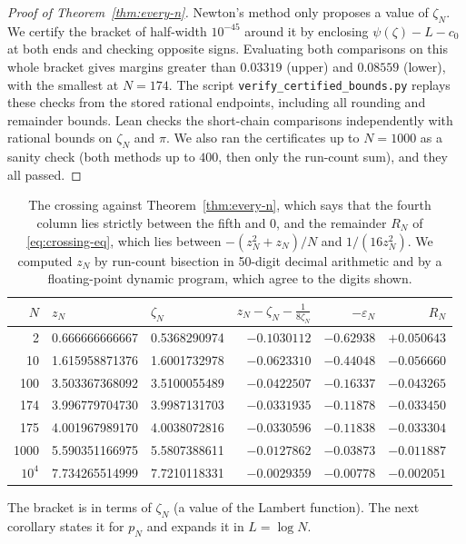 \begin{proof}[Proof of Theorem~\ref{thm:every-n}]
Newton's method only proposes a value of $\zeta_N$. We certify the bracket
of half-width $10^{-45}$ around it by enclosing
$\psi(\zeta)-L-c_0$ at both ends and checking opposite signs.
Evaluating both comparisons on this whole bracket gives margins greater than
$0.03319$ (upper) and $0.08559$ (lower), with the smallest at $N=174$.
The script \nolinkurl{verify_certified_bounds.py} replays these checks from
the stored rational endpoints, including all rounding and remainder bounds.
Lean checks the short-chain comparisons independently with rational bounds on $\zeta_N$ and $\pi$. We
also ran the certificates up to $N=1000$ as a sanity check (both methods up to
$400$, then only the run-count sum), and they all passed.
\end{proof}

\begin{table}[ht]
\centering\small
\begin{tabular}{@{}rllrrr@{}}
\toprule
$N$ & $z_N$ & $\zeta_N$ & $z_N-\zeta_N-\frac1{8\zeta_N}$ & $-\varepsilon_N$ & $R_N$\\
\midrule
2 & 0.666666666667 & 0.5368290974 & $-0.1030112$ & $-0.62938$ & $+0.050643$\\
10 & 1.615958871376 & 1.6001732978 & $-0.0623310$ & $-0.44048$ & $-0.056660$\\
100 & 3.503367368092 & 3.5100055489 & $-0.0422507$ & $-0.16337$ & $-0.043265$\\
174 & 3.996779704730 & 3.9987131703 & $-0.0331935$ & $-0.11878$ & $-0.033450$\\
175 & 4.001967989170 & 4.0038072816 & $-0.0330596$ & $-0.11838$ & $-0.033304$\\
1000 & 5.590351166975 & 5.5807388611 & $-0.0127862$ & $-0.03873$ & $-0.011887$\\
$10^4$ & 7.734265514999 & 7.7210118331 & $-0.0029359$ & $-0.00778$ & $-0.002051$\\
\bottomrule
\end{tabular}
\caption{The crossing against Theorem~\ref{thm:every-n}, which says that the fourth
column lies strictly between the fifth and $0$, and the remainder $R_N$ of
\eqref{eq:crossing-eq}, which lies between $-(z_N^2+z_N)/N$ and $1/(16z_N^2)$. We computed $z_N$ by run-count bisection in 50-digit decimal arithmetic
and by a floating-point dynamic program, which agree to the digits shown.}
\label{tab:every-n}
\end{table}

The bracket is in terms of $\zeta_N$ (a value of the Lambert function). The
next corollary states it for $p_N$ and
expands it in $L=\log N$.

